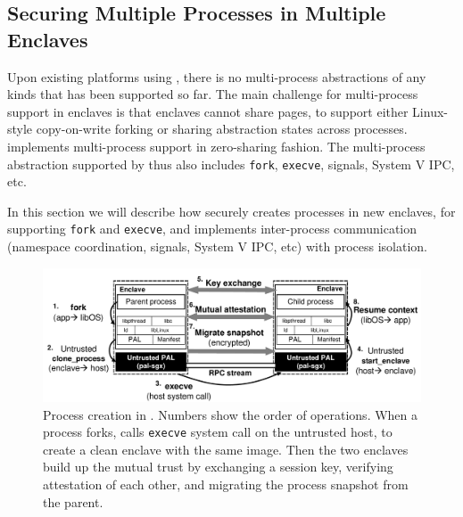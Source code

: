 \subsection{Securing Multiple Processes in Multiple Enclaves}
\label{sec:gsgx:multiproc}

Upon existing platforms using \sgx{}, there is no
multi-process abstractions of any kinds that has been supported so far.
The main challenge for multi-process support in enclaves
is that enclaves cannot share pages,
to support either Linux-style copy-on-write forking or
sharing abstraction states across processes.
\graphene{} implements multi-process support
in zero-sharing fashion.
The multi-process abstraction supported by \graphene{} thus also \sysname{}
includes {\tt fork}, {\tt execve}, signals, System V IPC, etc.

In this section we will describe how \sysname{} securely creates
processes in new enclaves,
for supporting {\tt fork} and {\tt execve},
and implements inter-process communication
(namespace coordination, signals, System V IPC, etc)
with process isolation.


\begin{figure}[t!]
\centering
\includegraphics[width=6.5in]{graphene-sgx/figures/fork.pdf}
\footnotesize
\caption[Process creation in \sysname{}]
{Process creation in \sysname{}.
Numbers show the order of operations.
When a process forks, \sysname{} calls {\tt execve} system call
on the untrusted host,
to create a clean enclave with the same \libos{} image.
Then the two enclaves build up the mutual trust by
exchanging a session key, verifying attestation of each other,
and migrating the process snapshot from the parent.}
\label{fig:gsgx:fork}
\end{figure}

